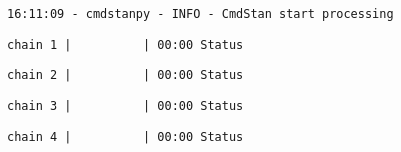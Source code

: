 \documentclass[11pt]{article}
\begin{document}
    \begin{Verbatim}[commandchars=\\\{\}]
16:11:09 - cmdstanpy - INFO - CmdStan start processing
    \end{Verbatim}

    
    \begin{Verbatim}[commandchars=\\\{\}]
chain 1 |          | 00:00 Status
    \end{Verbatim}

    
    
    \begin{Verbatim}[commandchars=\\\{\}]
chain 2 |          | 00:00 Status
    \end{Verbatim}

    
    
    \begin{Verbatim}[commandchars=\\\{\}]
chain 3 |          | 00:00 Status
    \end{Verbatim}

    
    
    \begin{Verbatim}[commandchars=\\\{\}]
chain 4 |          | 00:00 Status
    \end{Verbatim}

    
    \begin{Verbatim}[commandchars=\\\{\}]

    \end{Verbatim}
\end{document}
